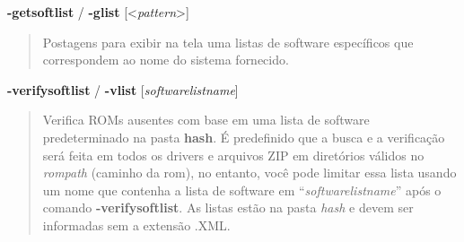 \documentclass[letterpaper,10pt,brazil]{sphinxmanual}
\begin{document}
\label{commandline/commandline-all:mame-commandline-getsoftlist}
\textbf{-getsoftlist} / \textbf{-glist} {[}\textless{}\emph{pattern}\textgreater{}{]}
\begin{quote}

Postagens para exibir na tela uma listas de software específicos
que correspondem ao nome do sistema fornecido.
\end{quote}
\label{commandline/commandline-all:mame-commandline-verifysoftlist}
\textbf{-verifysoftlist} / \textbf{-vlist} {[}\emph{softwarelistname}{]}
\begin{quote}

Verifica ROMs ausentes com base em uma lista de software
predeterminado na pasta \textbf{hash}.
É predefinido que a busca e a verificação será feita em todos os
drivers e arquivos ZIP em diretórios válidos no \emph{rompath} (caminho da
rom), no entanto, você pode limitar essa lista usando um nome que
contenha a lista de software em ``\emph{softwarelistname}'' após o comando
\textbf{-verifysoftlist}. As listas estão na pasta \emph{hash} e devem ser
informadas sem a extensão .XML.
\end{quote}
\end{document}
